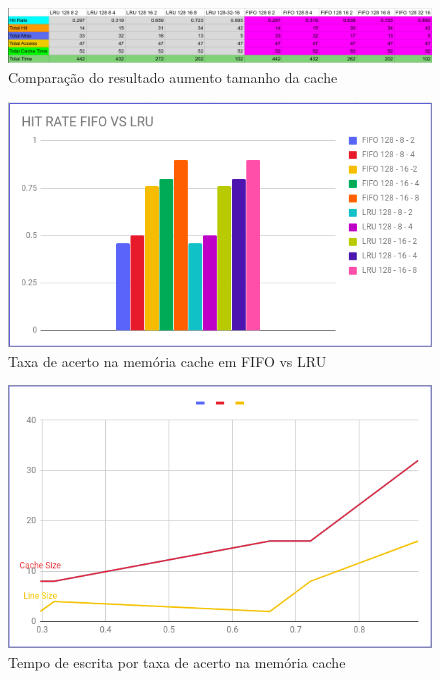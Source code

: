 \documentclass[conference]{IEEEtran}
\begin{document}
\begin{figure}
    \centering
    \includegraphics[width=\linewidth]{Imagens/Tabela 2.png}
    \caption{Comparação do resultado aumento tamanho da cache}
    \label{fig:my_label}
\end{figure}

\begin{figure}
    \centering
    \includegraphics[width=\linewidth]{Imagens/Hit RATE FIFO VS LRU.png}
    \caption{Taxa de acerto na memória cache em FIFO vs LRU}
    \label{fig:Taxa de acerto na memória cache em FIFO vs LRU}
\end{figure}

\begin{figure}
    \centering
    \includegraphics[width=\linewidth]{Imagens/WRITE TIME POR HIT RATE.png}
    \caption{Tempo de escrita por taxa de acerto na memória cache}
    \label{fig:Tempo de escrita por taxa de acerto na memória cache}
\end{figure}
\end{document}
